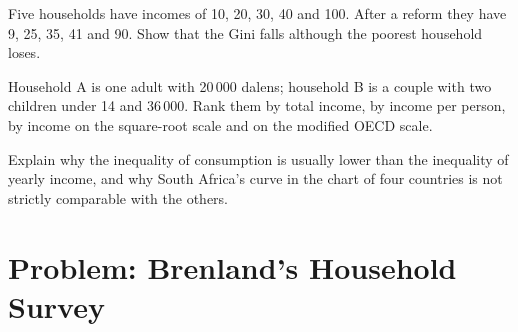 \begin{exercise}[$\star\star\star$]\label{exo:g11:inequality:13}
Five households have incomes of 10, 20, 30, 40 and 100. After a reform they have 9, 25, 35, 41 and 90. Show that the Gini falls although the poorest household loses.
\end{exercise}

\begin{exercise}[$\star\star\star$]\label{exo:g11:inequality:14}
Household A is one adult with 20\,000 dalens; household B is a couple with two children under 14 and 36\,000. Rank them by total income, by income per person, by income on
the square-root scale and on the modified OECD scale.
\end{exercise}

\begin{exercise}[$\star\star\star$]\label{exo:g11:inequality:15}
Explain why the inequality of consumption is usually lower than the inequality of yearly income, and why South Africa's curve in the chart of four countries is not
strictly comparable with the others.
\end{exercise}

\section{Problem: Brenland's Household Survey}

